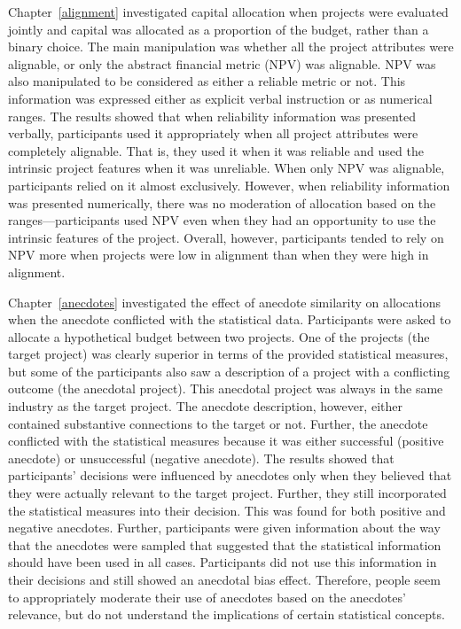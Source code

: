 \documentclass[a4paper, nobind, dvipsnames]{templates/ociamthesis}
\theoremstyle{definition}
\theoremstyle{definition}
\theoremstyle{definition}
\theoremstyle{definition}
\theoremstyle{remark}
\begin{document}
Chapter~\ref{alignment} investigated capital allocation when projects were
evaluated jointly and capital was allocated as a proportion of the budget,
rather than a binary choice. The main manipulation was whether all the project
attributes were alignable, or only the abstract financial metric (NPV) was
alignable. NPV was also manipulated to be considered as either a reliable metric
or not. This information was expressed either as explicit verbal instruction or
as numerical ranges. The results showed that when reliability information was
presented verbally, participants used it appropriately when all project
attributes were completely alignable. That is, they used it when it was reliable
and used the intrinsic project features when it was unreliable. When only NPV
was alignable, participants relied on it almost exclusively. However, when
reliability information was presented numerically, there was no moderation of
allocation based on the ranges---participants used NPV even when they had an
opportunity to use the intrinsic features of the project. Overall, however,
participants tended to rely on NPV more when projects were low in alignment than
when they were high in alignment.

Chapter~\ref{anecdotes} investigated the effect of anecdote similarity on
allocations when the anecdote conflicted with the statistical data. Participants
were asked to allocate a hypothetical budget between two projects. One of the
projects (the target project) was clearly superior in terms of the provided
statistical measures, but some of the participants also saw a description of a
project with a conflicting outcome (the anecdotal project). This anecdotal
project was always in the same industry as the target project. The anecdote
description, however, either contained substantive connections to the target or
not. Further, the anecdote conflicted with the statistical measures because it
was either successful (positive anecdote) or unsuccessful (negative anecdote).
The results showed that participants' decisions were influenced by anecdotes
only when they believed that they were actually relevant to the target project.
Further, they still incorporated the statistical measures into their decision.
This was found for both positive and negative anecdotes. Further, participants
were given information about the way that the anecdotes were sampled that
suggested that the statistical information should have been used in all cases.
Participants did not use this information in their decisions and still showed an
anecdotal bias effect. Therefore, people seem to appropriately moderate their
use of anecdotes based on the anecdotes' relevance, but do not understand the
implications of certain statistical concepts.
\end{document}

